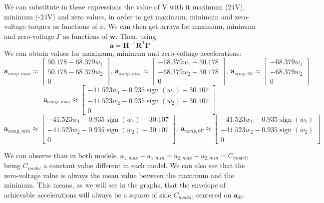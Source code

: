 \documentclass[12pt]{article}
\renewcommand{\vec}[1]{\bm{#1}}
\newcommand{\R}{\mathbb R}
\def\R{\vec R}
\begin{document}
We can substitute in these expressions the value of V with it maximum (24V), minimum (-24V) and zero values, in order to get maximum, minimum and zero-voltage torques as functions of $\dot \phi$. We can then get arrays for maximum, minimum and zero-voltage $\Gamma$ as functions of $\vec w$. Then, using
$$\vec a = \vec H^{-1} \R^{T} \vec \Gamma$$ 
We can obtain values for maximum, minimum and zero-voltage accelerations:
$$\vec a_{simp, max} \approx \left[\begin{matrix}50.178 - 68.379 w_{1}\\50.178 - 68.379 w_{2}\\0\end{matrix}\right], \  \vec a_{simp, min} \approx \left[\begin{matrix}- 68.379 w_{1} - 50.178\\- 68.379 w_{2} - 50.178\\0\end{matrix}\right], \  \vec a_{simp, 0V} \approx \left[\begin{matrix}- 68.379 w_{1}\\- 68.379 w_{2}\\0\end{matrix}\right]$$
$$\vec a_{comp, max} \approx \left[\begin{matrix}- 41.523 w_{1} - 0.935 \operatorname{sign}\left(w_{1}\right) + 30.107\\- 41.523 w_{2} - 0.935 \operatorname{sign}\left(w_{2}\right) + 30.107\\0\end{matrix}\right]$$
$$\vec a_{comp, min} \approx  \left[\begin{matrix}- 41.523 w_{1} - 0.935 \operatorname{sign}\left(w_{1}\right) - 30.107\\- 41.523 w_{2} - 0.935 \operatorname{sign}\left(w_{2}\right) - 30.107\\0\end{matrix}\right], \ \vec a_{comp, 0V} \approx   \left[\begin{matrix}- 41.523 w_{1} - 0.935 \operatorname{sign}\left(w_{1}\right)\\- 41.523 w_{2} - 0.935 \operatorname{sign}\left(w_{2}\right)\\0\end{matrix}\right]$$

We can observe than in both models, $a_{1,max} - a_{1,min} = a_{2,max} - a_{2,min} = C_{model}$, being $C_{model}$ a constant value different in each model. We can also see that the zero-voltage value is always the mean value between the maximum and the minimum. This means, as we will see in the graphs, that the envelope of achievable accelerations will always be a square of side $C_{model}$, centered on $\vec a_{0V}$.
\end{document}
